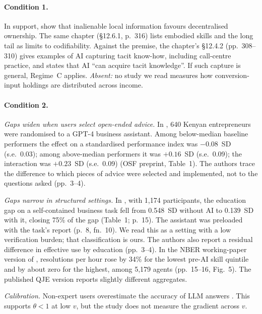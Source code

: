 \documentclass[12pt]{article}
\theoremstyle{remark}
\begin{document}
\paragraph{Condition 1.} In support, \citet[Proposition~2, p.~308]{brynjolfsson2026hayek} show that inalienable local information favours decentralised ownership. The same chapter (\S12.6.1, p.~316) lists embodied skills and the long tail as limits to codifiability. Against the premise, the chapter's \S12.4.2 (pp.~308--310) gives examples of AI capturing tacit know-how, including call-centre practice, and \citet[p.~33]{garicano2026comment} states that AI ``can acquire tacit knowledge''. If such capture is general, Regime~C applies. \emph{Absent:} no study we read measures how conversion-input holdings are distributed across income.

\paragraph{Condition 2.} \emph{Gaps widen when users select open-ended advice.} In \citet{otis2026uneven}, 640 Kenyan entrepreneurs were randomised to a GPT-4 business assistant. Among below-median baseline performers the effect on a standardised performance index was $-0.08$~SD (s.e.\ 0.03); among above-median performers it was $+0.16$~SD (s.e.\ 0.09); the interaction was $+0.23$~SD (s.e.\ 0.09) (OSF preprint, Table~1). The authors trace the difference to which pieces of advice were selected and implemented, not to the questions asked (pp.~3--4).

\emph{Gaps narrow in structured settings.} In \citet{cruces2026narrow}, with 1,174 participants, the education gap on a self-contained business task fell from 0.548~SD without AI to 0.139~SD with it, closing 75\% of the gap (Table~1; p.~15). The assistant was preloaded with the task's report (p.~8, fn.~10). We read this as a setting with a low verification burden; that classification is ours. The authors also report a residual difference in effective use by education (pp.~3--4). In the NBER working-paper version of \citet{brynjolfsson2025work}, resolutions per hour rose by 34\% for the lowest pre-AI skill quintile and by about zero for the highest, among 5,179 agents (pp.~15--16, Fig.~5). The published QJE version reports slightly different aggregates.

\emph{Calibration.} Non-expert users overestimate the accuracy of LLM answers \citep[arXiv v2, pp.~12--13]{steyvers2025know}. This supports $\theta<1$ at low $v$, but the study does not measure the gradient across $v$.
\end{document}
